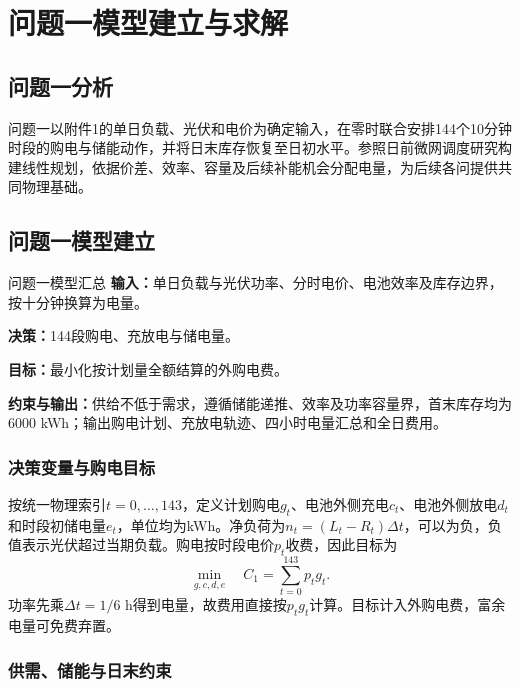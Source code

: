 \section{问题一模型建立与求解}

\subsection{问题一分析}

问题一以附件1的单日负载、光伏和电价为确定输入，在零时联合安排144个10分钟时段的购电与储能动作，并将日末库存恢复至日初水平。参照日前微网调度研究\cite{kong2016,silva2020}构建线性规划，依据价差、效率、容量及后续补能机会分配电量，为后续各问提供共同物理基础。

\subsection{问题一模型建立}

\begin{modelsummary}{问题一模型汇总}
\textbf{输入：}单日负载与光伏功率、分时电价、电池效率及库存边界，按十分钟换算为电量。\par
\textbf{决策：}144段购电、充放电与储电量。\par
\textbf{目标：}最小化按计划量全额结算的外购电费。\par
\textbf{约束与输出：}供给不低于需求，遵循储能递推、效率及功率容量界，首末库存均为6000 kWh；输出购电计划、充放电轨迹、四小时电量汇总和全日费用。
\end{modelsummary}

\subsubsection{决策变量与购电目标}

按统一物理索引$t=0,\ldots,143$，定义计划购电$g_t$、电池外侧充电$c_t$、电池外侧放电$d_t$和时段初储电量$e_t$，单位均为kWh。净负荷为$n_t=(L_t-R_t)\Delta t$，可以为负，负值表示光伏超过当期负载。购电按时段电价$p_t$收费，因此目标为
\begin{equation}
 \min_{g,c,d,e}\quad C_1=\sum_{t=0}^{143}p_tg_t.
 \label{eq:q1_objective}
\end{equation}
功率先乘$\Delta t=1/6$ h得到电量，故费用直接按$p_tg_t$计算。目标计入外购电费，富余电量可免费弃置。

\subsubsection{供需、储能与日末约束}

